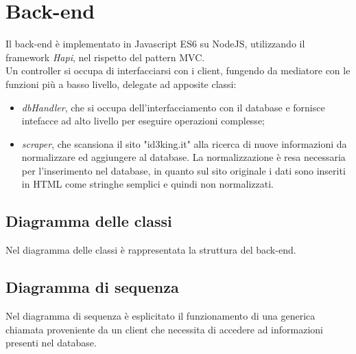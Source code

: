 \documentclass[11pt]{report}
\begin{document}
\section{Back-end}
Il back-end è implementato in Javascript ES6 su NodeJS, utilizzando il framework \textit{Hapi}, nel rispetto del pattern MVC.
\\Un controller si occupa di interfacciarsi con i client, fungendo da mediatore con le funzioni più a basso livello, delegate ad apposite classi:
\begin{itemize}
	\item \textit{dbHandler}, che si occupa dell'interfacciamento con il database e fornisce intefacce ad alto livello per eseguire operazioni complesse;
	\item \textit{scraper}, che scansiona il sito "id3king.it" alla ricerca di nuove informazioni da normalizzare ed aggiungere al database.
	La normalizzazione è resa necessaria per l'inserimento nel database, in quanto sul sito originale i dati sono inseriti in HTML come stringhe semplici e quindi non normalizzati.
\end{itemize}
\subsection{Diagramma delle classi}
Nel diagramma delle classi è rappresentata la struttura del back-end.
\subsection{Diagramma di sequenza}
Nel diagramma di sequenza è esplicitato il funzionamento di una generica chiamata proveniente da un client che necessita di accedere ad informazioni presenti nel database.
\end{document}
